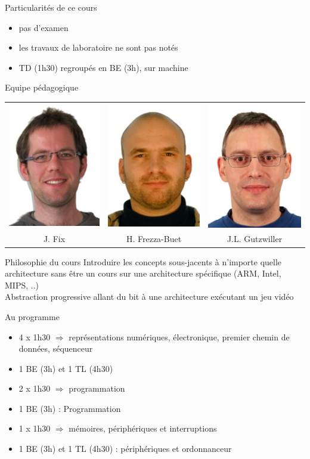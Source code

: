 \documentclass{beamer}
\begin{document}
\begin{frame}
\begin{block}{Particularités de ce cours}
\begin{itemize}
\item pas d'examen
\item les travaux de laboratoire ne sont pas notés
\item TD (1h30) regroupés en BE (3h), sur machine 
\end{itemize}
\end{block}
\begin{block}{Equipe pédagogique}
  \begin{tabular}{ccc}
    \includegraphics[width=0.1\columnwidth]{Figs/fix_jer.jpg}&
    \includegraphics[width=0.1\columnwidth]{Figs/frezza.jpg}&
    \includegraphics[width=0.1\columnwidth]{Figs/gutzwiller.jpg}\\
    J. Fix & H. Frezza-Buet & J.L. Gutzwiller
  \end{tabular}
  \end{block}
\end{frame}

\begin{frame}
  \begin{footnotesize}
  \begin{block}{Philosophie du cours}
    Introduire les concepts sous-jacents à n'importe quelle architecture sans être un cours sur une architecture spécifique (ARM, Intel, MIPS, ..)\\
    Abstraction progressive allant du bit à une architecture exécutant un jeu vidéo
  \end{block}
\begin{block}{Au programme}
\begin{itemize}
\item 4 x 1h30 $\Rightarrow$ représentations numériques, électronique, premier chemin de données, séquenceur
\item 1 BE (3h) et 1 TL (4h30)
\item 2 x 1h30 $\Rightarrow$ programmation
\item 1 BE (3h) : Programmation
\item 1 x 1h30 $\Rightarrow$ mémoires, périphériques et interruptions
\item 1 BE (3h) et 1 TL (4h30) : périphériques et ordonnanceur
\end{itemize}
\end{block}
\end{footnotesize}
\end{frame}
\end{document}

